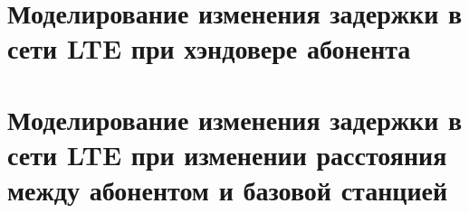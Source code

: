 \appendix
\chapter{Моделирование изменения задержки в сети LTE при хэндовере абонента} \label{AppendixA}



\clearpage

\chapter{Моделирование изменения задержки в сети LTE при изменении расстояния между абонентом и базовой станцией} \label{AppendixB}

\clearpage


